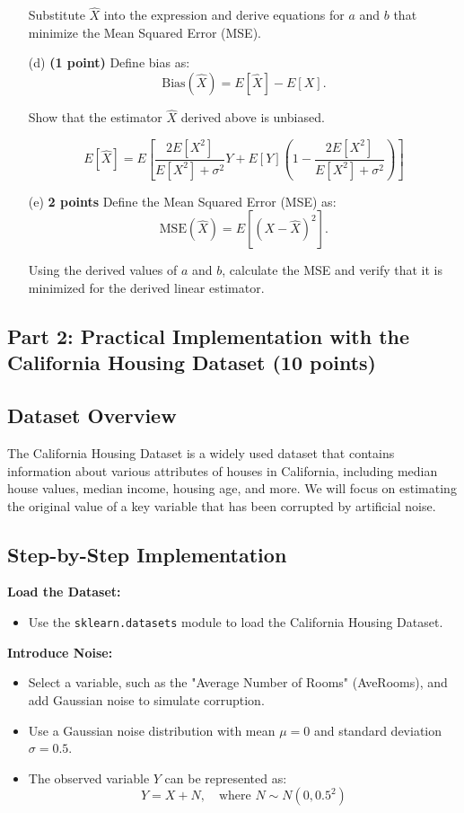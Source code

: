\documentclass{article}
\begin{document}
\begin{enumerate}
    Substitute \( \hat{X} \) into the expression and derive equations for \( a \) and \( b \) that minimize the Mean Squared Error (MSE).

    \item[(d)] \textbf{(1 point)} Define bias as:
    \[
    \text{Bias}(\hat{X}) = E[\hat{X}] - E[X].
    \]

    
    Show that the estimator \( \hat{X} \) derived above is unbiased.

    \[
    E[\hat{X}] = E\left[\frac{2E[X^2]}{E[X^2] + \sigma^2}Y + E[Y](1 - \frac{2E[X^2]}{E[X^2] + \sigma^2})\right]
    \]

    \item[(e)] \textbf{2 points} Define the Mean Squared Error (MSE) as:
    \[
    \text{MSE}(\hat{X}) = E[(X - \hat{X})^2].
    \]
    
    Using the derived values of \( a \) and \( b \), calculate the MSE and verify that it is minimized for the derived linear estimator. 
\end{enumerate}

\subsection*{Part 2: Practical Implementation with the California Housing Dataset (10 points)}

\subsection*{Dataset Overview}
The California Housing Dataset is a widely used dataset that contains information about various attributes of houses in California, including median house values, median income, housing age, and more. We will focus on estimating the original value of a key variable that has been corrupted by artificial noise.

\subsection*{Step-by-Step Implementation}

\textbf{Load the Dataset:}
\begin{itemize}
    \item Use the \texttt{sklearn.datasets} module to load the California Housing Dataset.
\end{itemize}

\textbf{Introduce Noise:}
\begin{itemize}
    \item Select a variable, such as the "Average Number of Rooms" (AveRooms), and add Gaussian noise to simulate corruption. 
    \item Use a Gaussian noise distribution with mean $\mu = 0$ and standard deviation $\sigma = 0.5$.
    \item The observed variable $Y$ can be represented as:
    \[
    Y = X + N, \quad \text{where } N \sim N(0, 0.5^2)
    \]
\end{itemize}
\end{document}
